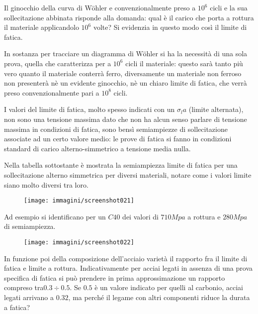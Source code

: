 \documentclass{article}
\begin{document}
\begin{adjustwidth}{2in}{}
			Il ginocchio della curva di Wöhler e convenzionalmente preso a $10^6$ cicli e la sua sollecitazione abbinata risponde alla domanda: qual è il carico che porta a rottura il materiale applicandolo $10^6$ volte? Si evidenzia in questo modo così il limite di fatica.
			
			In sostanza per tracciare un diagramma di Wöhler si ha la necessità di una sola prova, quella che caratterizza per a $10^6$ cicli il materiale: questo sarà tanto più vero quanto il materiale conterrà ferro, diversamente un materiale non ferroso non presenterà nè un evidente ginocchio, nè un chiaro limite di fatica, che verrà preso convenzionalmente pari a $10^8$ cicli. \newline
			
			I valori del limite di fatica, molto spesso indicati con un $\sigma_la$ (limite alternata), non sono una tensione massima dato che non ha alcun senso parlare di tensione massima in condizioni di fatica, sono bensì semiampiezze di sollecitazione associate ad un certo valore medio: le prove di fatica si fanno in condizioni standard di carico alterno-simmetrico a tensione media nulla. 
			
			Nella tabella sottostante è mostrata la semiampiezza limite di fatica per una sollecitazione alterno simmetrica per diversi materiali, notare come i valori limite siano molto diversi tra loro.
			
			\begin{figure}[H]
				\centering
				\texttt{[image: immagini/screenshot021]}
				\label{fig:screenshot021}
			\end{figure}			
			
			Ad esempio si identificano per un $ C40 $ dei valori di $ 710Mpa $ a rottura e $ 280Mpa $  di semiampiezza. 
			
			\begin{figure}[H]
				\centering
				\texttt{[image: immagini/screenshot022]}
				\label{fig:screenshot022}
			\end{figure}
			
			In funzione poi della composizione dell'acciaio varietà il rapporto fra il limite di fatica e limite a rottura. Indicativamente per acciai legati in assenza  di una prova specifica di fatica si può prendere in prima approssimazione un rapporto compreso tra$  0.3 \div 0.5 $. Se $ 0.5 $ è un valore indicato per quelli al carbonio, acciai legati arrivano a $ 0.32 $, ma perché il legame con altri componenti riduce la durata a fatica? 
			

\end{adjustwidth}
\end{document}
